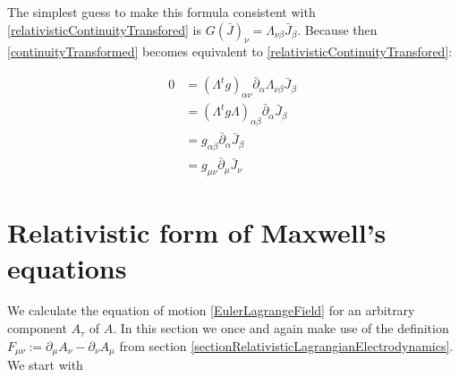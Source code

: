 \documentclass{article}
\begin{document}
The simplest guess to make this formula consistent with \ref{relativisticContinuityTransfored} is $G(\bar{J})_\nu = \Lambda_{\nu\beta} \bar{J}_\beta$.
Because then \ref{continuityTransformed} becomes equivalent to \ref{relativisticContinuityTransfored}:

\begin{align}
    0 & = (\Lambda^t g )_{\alpha\nu} \bar{\partial}_\alpha  \Lambda_{\nu\beta} \bar{J}_\beta \nonumber \\
      & = (\Lambda^t g \Lambda)_{\alpha\beta} \bar{\partial}_\alpha  \bar{J}_\beta \nonumber \\
      & = g_{\alpha\beta} \bar{\partial}_\alpha  \bar{J}_\beta \nonumber \\
      & = g_{\mu\nu} \bar{\partial}_\mu  \bar{J}_\nu \nonumber
\end{align}

\section{Relativistic form of Maxwell's equations}
We calculate the equation of motion \ref{EulerLagrangeField} for an arbitrary component $A_\tau$ of $A$.
In this section we once and again make use of the definition $F_{\mu\nu} := \partial_\mu A_\nu - \partial_\nu A_\mu$ from section \ref{sectionRelativisticLagrangianElectrodynamics}.
We start with
\end{document}
